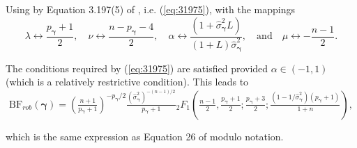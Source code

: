 \documentclass[12pt]{article}
\def\vectorfonttwo{\boldsymbol}
\def\vgamma{{\vectorfonttwo \gamma}}             %
\def\ds{\displaystyle}
\begin{document}
\noindent 
Using by Equation 3.197(5) of \cite{Gradshteyn2007}, i.e. (\ref{eq:31975}), 
with the mappings
$$
\lambda \leftrightarrow \frac{p_\vgamma+1}{2},
\quad 
\nu \leftrightarrow \frac{n - p_\vgamma - 4}{2},
\quad 
\alpha \leftrightarrow \frac{(1 + \widehat{\sigma}_\vgamma^2 L)}{(1 + L)\widehat{\sigma}_\vgamma^2},
\quad \mbox{and} \quad 
\mu \leftrightarrow -\frac{n-1}{2}.
$$

\noindent The conditions required by (\ref{eq:31975}) are satisfied
provided $\alpha \in (-1,1)$ (which is a relatively restrictive condition). 
%
%
This leads to
\begin{equation}\label{eq:yGivenGammaRobust}
\ds \mbox{BF}_{{rob}}(\vgamma)
= \left( \tfrac{n + 1}{ p_\vgamma + 1} \right)^{ - p_\vgamma/2} \tfrac{(\widehat{\sigma}_\vgamma^2)^{-(n-1)/2}}{p_\vgamma+1}
{}_2F_1\left( \tfrac{n-1}{2}, \tfrac{p_\vgamma+1}{2}; \tfrac{p_\vgamma+3}{2}  ; 
\tfrac{(1  - 1/\widehat{\sigma}_\vgamma^2)(p_\vgamma + 1)}{1 + n}  \right),
\end{equation}


\noindent 
which is the same expression as Equation 26 of \cite{Bayarri2012}
modulo notation.
\end{document}
